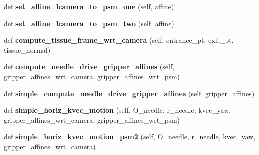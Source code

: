 \begin{DoxyCompactItemize}
\item 
def {\bfseries set\+\_\+affine\+\_\+lcamera\+\_\+to\+\_\+psm\+\_\+one} (self, affine)\hypertarget{classneedle__planner_1_1needle__planner_af8756758baa6a4e81453d9101542a2ff}{}\label{classneedle__planner_1_1needle__planner_af8756758baa6a4e81453d9101542a2ff}

\item 
def {\bfseries set\+\_\+affine\+\_\+lcamera\+\_\+to\+\_\+psm\+\_\+two} (self, affine)\hypertarget{classneedle__planner_1_1needle__planner_a8d7e7cc38478ac55d8ef7935a9ad77bf}{}\label{classneedle__planner_1_1needle__planner_a8d7e7cc38478ac55d8ef7935a9ad77bf}

\item 
def {\bfseries compute\+\_\+tissue\+\_\+frame\+\_\+wrt\+\_\+camera} (self, entrance\+\_\+pt, exit\+\_\+pt, tissue\+\_\+normal)\hypertarget{classneedle__planner_1_1needle__planner_aa494cd927f266c3c4f3acb3d42604acf}{}\label{classneedle__planner_1_1needle__planner_aa494cd927f266c3c4f3acb3d42604acf}

\item 
def {\bfseries compute\+\_\+needle\+\_\+drive\+\_\+gripper\+\_\+affines} (self, gripper\+\_\+affines\+\_\+wrt\+\_\+camera, gripper\+\_\+affines\+\_\+wrt\+\_\+psm)\hypertarget{classneedle__planner_1_1needle__planner_a0e6b62458ff78a5f9e2fac52125d7698}{}\label{classneedle__planner_1_1needle__planner_a0e6b62458ff78a5f9e2fac52125d7698}

\item 
def {\bfseries simple\+\_\+compute\+\_\+needle\+\_\+drive\+\_\+gripper\+\_\+affines} (self, gripper\+\_\+affines)\hypertarget{classneedle__planner_1_1needle__planner_a00bd1fbf4a25b96d073fba2314dd899a}{}\label{classneedle__planner_1_1needle__planner_a00bd1fbf4a25b96d073fba2314dd899a}

\item 
def {\bfseries simple\+\_\+horiz\+\_\+kvec\+\_\+motion} (self, O\+\_\+needle, r\+\_\+needle, kvec\+\_\+yaw, gripper\+\_\+affines\+\_\+wrt\+\_\+camera, gripper\+\_\+affines\+\_\+wrt\+\_\+psm)\hypertarget{classneedle__planner_1_1needle__planner_a40efc62e1fb441cc6d866a2a66d99097}{}\label{classneedle__planner_1_1needle__planner_a40efc62e1fb441cc6d866a2a66d99097}

\item 
def {\bfseries simple\+\_\+horiz\+\_\+kvec\+\_\+motion\+\_\+psm2} (self, O\+\_\+needle, r\+\_\+needle, kvec\+\_\+yaw, gripper\+\_\+affines\+\_\+wrt\+\_\+camera)\hypertarget{classneedle__planner_1_1needle__planner_a37a368e276417246a4d0c865dfb4cb08}{}\label{classneedle__planner_1_1needle__planner_a37a368e276417246a4d0c865dfb4cb08}


\end{DoxyCompactItemize}
